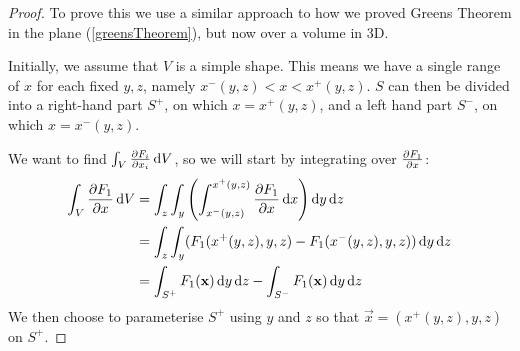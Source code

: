 \documentclass[../main.tex]{subfiles}
\begin{document}
\begin{proof}
  \nonexaminable
  To prove this we use a similar approach to how we proved Greens Theorem in the plane (\cref{greensTheorem}), but now over a volume in 3D.

  Initially, we assume that $V$ is a simple shape.
  This means we have a single range of $x$ for each fixed $y, z$, namely $x^{-}(y, z) < x < x^{+}(y, z)$.
  $S$ can then be divided into a right-hand part $S^{+}$, on which $x = x^{+}(y, z)$, and a left hand part $S^{-}$, on which $x = x^{-}(y, z)$.

  We want to find $\int_{V} \pderiv{F_i}{x_i} \d{V}$, so we will start by integrating over $\pderiv{F_1}{x}$:
  \begin{align*}
    \int_{V} \pderiv{F_1}{x} \d{V} &= \int_{z} \int_{y} \left(\int_{x^{-}(y, z)}^{x^{+}(y, z)} \pderiv{F_1}{x} \d{x}\right) \d{y} \d{z} \\
    &= \int_{z} \int_{y} (F_1(x^{+}(y, z), y, z) - F_1(x^{-}(y, z), y, z)) \d{y} \d{z} \\
    &= \int_{S^{+}} F_1(\vec{x}) \d{y} \d{z} - \int_{S^{-}} F_1(\vec{x}) \d{y}\d{z}
  \end{align*}
  We then choose to parameterise $S^{+}$ using $y$ and $z$ so that $\vec{x} = (x^{+}(y, z), y, z)$ on $S^{+}$.


\end{proof}
\end{document}
